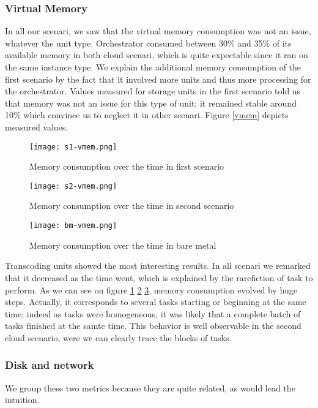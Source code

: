 \documentclass[a4paper, titlepage]{paper}
\numberwithin{figure}{section}
\numberwithin{table}{section}
\begin{document}
      \subsubsection{Virtual Memory}
        In all our scenari, we saw that the virtual memory consumption was not an issue, whatever the unit type. Orchestrator consumed between 30\% and 35\% of its available memory in both cloud scenari, which is quite expectable since it ran on the same instance type. We explain the additional memory consumption of the first scenario by the fact that it involved more units and thus more processing for the orchestrator. Values measured for storage units in the first scenario told us that memory was not an issue for this type of unit; it remained stable around 10\% which convince us to neglect it in other scenari. Figure \ref{vmem} depicts measured values.
        
        \begin{figure}
          \centering
          \texttt{[image: s1-vmem.png]}
          \caption{Memory consumption over the time in first scenario}
          \label{s1v}
        \end{figure}
        \begin{figure}
          \centering
          \texttt{[image: s2-vmem.png]}
          \caption{Memory consumption over the time in second scenario}
          \label{s2v}
        \end{figure}
        \begin{figure}
          \centering
          \texttt{[image: bm-vmem.png]}
          \caption{Memory consumption over the time in bare metal}
          \label{bmv}
        \end{figure}

        Transcoding units showed the most interesting results. In all scenari we remarked that it decreased as the time went, which is explained by the rarefiction of task to perform. As we can see on figure \ref{s1v} \ref{s2v} \ref{bmv}, memory consumption evolved by huge steps. Actually, it corresponds to several tasks starting or beginning at the same time; indeed as tasks were homogeneous, it was likely that a complete batch of tasks finished at the samte time. This behavior is well observable in the second cloud scenario, were we can clearly trace the blocks of tasks.

      \subsubsection{Disk and network}
        We group these two metrics because they are quite related, as would lead the intuition.
\end{document}
